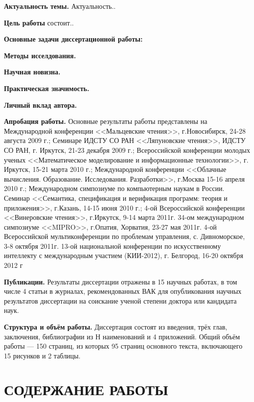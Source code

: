 \documentclass[a4paper]{report}
\begin{document}
\textbf{Актуальность темы.}
Актуальность..

\textbf{Цель работы} состоит..

\textbf{Основные задачи диссертационной работы:}

\textbf{Методы исселдования.}

\textbf{Научная новизна.}

\textbf{Практическая значимость.}

\textbf{Личный вклад автора.}

\textbf{Апробация работы.}
Основные результаты работы представлены на Международной конференции <<Мальцевские чтения>>, г.Новосибирск, 24-28 августа 2009 г.;
Семинаре ИДСТУ СО РАН <<Ляпуновские чтения>>, ИДСТУ СО РАН, г. Иркутск, 21-23 декабря 2009 г.;
Всероссийской конференции молодых ученых <<Математическое моделирование и информационные технологии>>, г. Иркутск, 15-21 марта 2010 г.;
Международной конференции <<Облачные вычисления. Образование. Исследования. Разработки>>, г.Москва 15-16 апреля 2010 г.;
Международном симпозиуме по компьютерным наукам в России. Семинар <<Семантика, спецификация и верификация программ: теория и приложения>>, г.Казань, 14-15 июня 2010 г.;
4-ой Всероссийской конференции <<Винеровские чтения>>, г.Иркутск, 9-14 марта 2011г.
34-ом международном симпозиуме <<MIPRO>>, г.Опатия, Хорватия, 23-27 мая 2011г.
4-ой Всероссийской мультиконференции по проблемам управления, с. Дивноморское, 3-8 октября 2011г.
13-ой национальной конференции по искусственному интеллекту с международным участием (КИИ-2012), г. Белгород, 16-20 октября 2012 г


\textbf{Публикации.} Результаты диссертации отражены в 15 научных работах, в том числе 4 статьи в журналах, рекомендованных ВАК для опубликования научных результатов диссертации на соискание ученой степени доктора или кандидата наук.

\textbf{Структура и объём работы.} Диссертация состоят из введения, трёх глав, заключения, библиографии из Н наименований и 4 приложений. Общий объём работы --- 150 страниц, из которых 95 страниц основного текста, включающего 15 рисунков и 2 таблицы.


\section*{СОДЕРЖАНИЕ РАБОТЫ}
\end{document}

